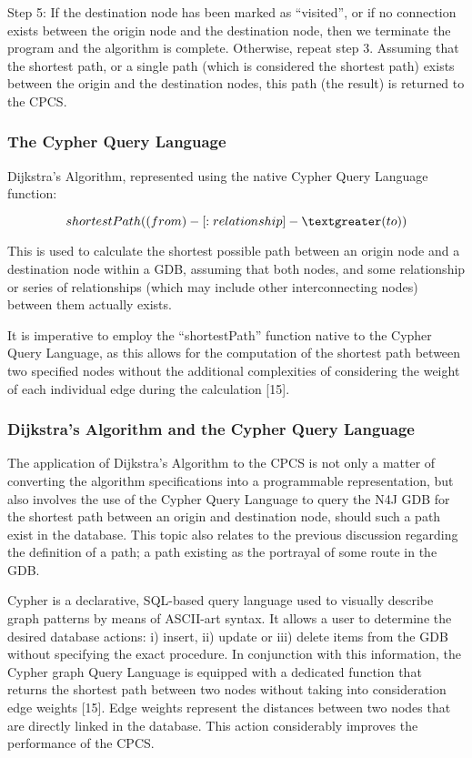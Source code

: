 \documentclass[12pt]{article}   	%
\begin{document}
\noindent
Step 5: If the destination node has been marked as “visited”, or if no connection exists between the origin node and the destination node, then we terminate the program and the algorithm is complete. Otherwise, repeat step 3.
	Assuming that the shortest path, or a single path (which is considered the shortest path) exists between the origin and the destination nodes, this path (the result) is returned to the CPCS.

\subsubsection{The Cypher Query Language}
Dijkstra’s Algorithm, represented using the native Cypher Query Language function:

\hfill
\noindent
\[shortestPath( (from) - [:relationship] -\textgreater (to) ) \]
\hfill

This is used to calculate the shortest possible path between an origin node and a destination node within a GDB, assuming that both nodes, and some relationship or series of relationships (which may include other interconnecting nodes) between them actually exists.

It is imperative to employ the “shortestPath” function native to the Cypher Query Language, as this allows for the computation of the shortest path between two specified nodes without the additional complexities of considering the weight of each individual edge during the calculation [15].

\newpage

\subsubsection{Dijkstra's Algorithm and the Cypher Query Language}
The application of Dijkstra’s Algorithm to the CPCS is not only a matter of converting the algorithm specifications into a programmable representation, but also involves the use of the Cypher Query Language to query the N4J GDB for the shortest path between an origin and destination node, should such a path exist in the database. This topic also relates to the previous discussion regarding the definition of a path; a path existing as the portrayal of some route in the GDB.

Cypher is a declarative, SQL-based query language used to visually describe graph patterns by means of ASCII-art syntax. It allows a user to determine the desired database actions: i) insert, ii) update or iii) delete items from the GDB without specifying the exact procedure. In conjunction with this information, the Cypher graph Query Language is equipped with a dedicated function that returns the shortest path between two nodes without taking into consideration edge weights [15]. Edge weights represent the distances between two nodes that are directly linked in the database. This action considerably improves the performance of the CPCS.
\end{document}
